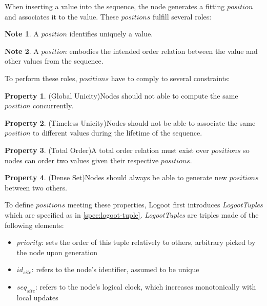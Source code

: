 \documentclass{article}
\theoremstyle{definition}
\newtheorem{note}{Note}
\newtheorem{property}{Property}
\begin{document}
When inserting a value into the sequence, the node generates a fitting $position$ and associates it to the value.
These $positions$ fulfill several roles:

\begin{note}
    A $position$ identifies uniquely a value.
\end{note}

\begin{note}
    A $position$ embodies the intended order relation between the value and other values from the sequence.
\end{note}


To perform these roles, $positions$ have to comply to several constraints:

\begin{property}(Global Unicity)\label{prop:global-unicity}
    Nodes should not able to compute the same $position$ concurrently.
\end{property}

\begin{property}(Timeless Unicity)\label{prop:timeless-unicity}
    Nodes should not be able to associate the same $position$ to different values during the lifetime of the sequence.
\end{property}

\begin{property}(Total Order)\label{prop:total-order}
    A total order relation must exist over $positions$ so nodes can order two values given their respective $positions$.
\end{property}

\begin{property}(Dense Set)\label{prop:dense-set}
    Nodes should always be able to generate new $positions$ between two others.
\end{property}

To define $positions$ meeting these properties, Logoot first introduces \emph{LogootTuples} which are specified as in \autoref{spec:logoot-tuple}.
\emph{LogootTuples} are triples made of the following elements:
\begin{itemize}
    \item $priority$: sets the order of this tuple relatively to others, arbitrary picked by the node upon generation
    \item $id_{site}$: refers to the node's identifier, assumed to be unique
    \item $seq_{site}$: refers to the node's logical clock, which increases monotonically with local updates
\end{itemize}
\end{document}

